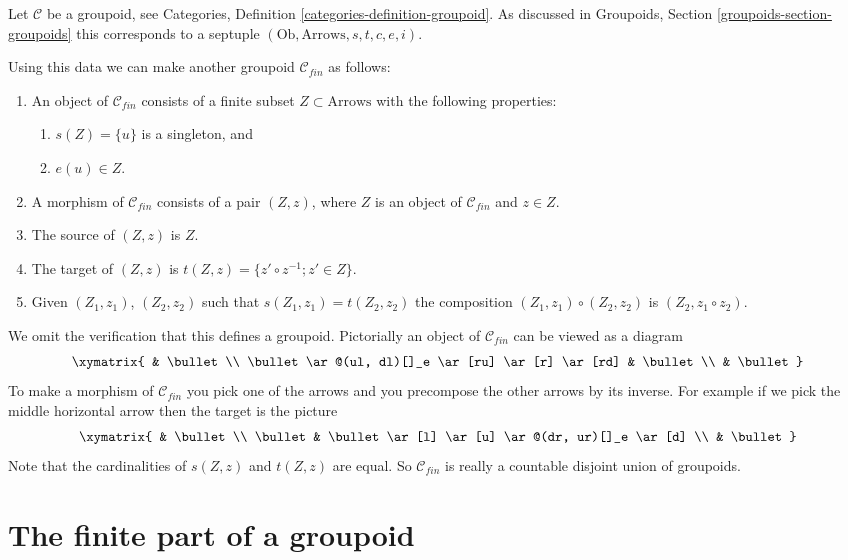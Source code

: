 \noindent
Let $\mathcal{C}$ be a groupoid, see
Categories, Definition \ref{categories-definition-groupoid}.
As discussed in
Groupoids, Section \ref{groupoids-section-groupoids}
this corresponds to a septuple $(\text{Ob}, \text{Arrows}, s, t, c, e, i)$.

\medskip\noindent
Using this data we can make another groupoid $\mathcal{C}_{fin}$
as follows:
\begin{enumerate}
\item An object of $\mathcal{C}_{fin}$ consists of a finite subset
$Z \subset \text{Arrows}$ with the following properties:
\begin{enumerate}
\item $s(Z) = \{u\}$ is a singleton, and
\item $e(u) \in Z$.
\end{enumerate}
\item A morphism of $\mathcal{C}_{fin}$ consists of a pair
$(Z, z)$, where $Z$ is an object of $\mathcal{C}_{fin}$ and
$z \in Z$.
\item The source of $(Z, z)$ is $Z$.
\item The target of $(Z, z)$ is $t(Z, z) = \{z' \circ z^{-1}; z' \in Z\}$.
\item Given $(Z_1, z_1)$, $(Z_2, z_2)$ such that $s(Z_1, z_1) = t(Z_2, z_2)$
the composition $(Z_1, z_1) \circ (Z_2, z_2)$ is $(Z_2, z_1 \circ z_2)$.
\end{enumerate}
We omit the verification that this defines a groupoid.
Pictorially an object of $\mathcal{C}_{fin}$ can be viewed
as a diagram
$$
\xymatrix{
& \bullet \\
\bullet \ar@(ul, dl)[]_e \ar[ru] \ar[r] \ar[rd] & \bullet \\
& \bullet
}
$$
To make a morphism of $\mathcal{C}_{fin}$ you pick one of the arrows
and you precompose the other arrows by its inverse. For example if we pick
the middle horizontal arrow then the target is the picture
$$
\xymatrix{
& \bullet \\
\bullet & \bullet \ar[l] \ar[u] \ar@(dr, ur)[]_e \ar[d] \\
& \bullet
}
$$
Note that the cardinalities of $s(Z, z)$ and $t(Z, z)$ are equal.
So $\mathcal{C}_{fin}$ is really a countable disjoint union of
groupoids.




\section{The finite part of a groupoid}
\label{section-finite-part-groupoid}

